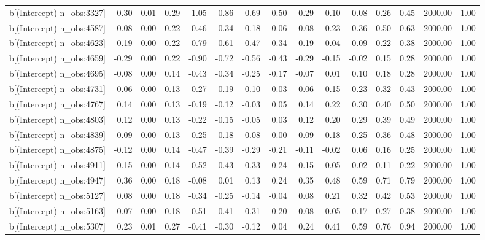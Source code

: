 \begin{table}[ht]
\begin{tabular}{rrrrrrrrrrrrrrr}
  b[(Intercept) n\_obs:3327] & -0.30 & 0.01 & 0.29 & -1.05 & -0.86 & -0.69 & -0.50 & -0.29 & -0.10 & 0.08 & 0.26 & 0.45 & 2000.00 & 1.00 \\ 
  b[(Intercept) n\_obs:4587] & 0.08 & 0.00 & 0.22 & -0.46 & -0.34 & -0.18 & -0.06 & 0.08 & 0.23 & 0.36 & 0.50 & 0.63 & 2000.00 & 1.00 \\ 
  b[(Intercept) n\_obs:4623] & -0.19 & 0.00 & 0.22 & -0.79 & -0.61 & -0.47 & -0.34 & -0.19 & -0.04 & 0.09 & 0.22 & 0.38 & 2000.00 & 1.00 \\ 
  b[(Intercept) n\_obs:4659] & -0.29 & 0.00 & 0.22 & -0.90 & -0.72 & -0.56 & -0.43 & -0.29 & -0.15 & -0.02 & 0.15 & 0.28 & 2000.00 & 1.00 \\ 
  b[(Intercept) n\_obs:4695] & -0.08 & 0.00 & 0.14 & -0.43 & -0.34 & -0.25 & -0.17 & -0.07 & 0.01 & 0.10 & 0.18 & 0.28 & 2000.00 & 1.00 \\ 
  b[(Intercept) n\_obs:4731] & 0.06 & 0.00 & 0.13 & -0.27 & -0.19 & -0.10 & -0.03 & 0.06 & 0.15 & 0.23 & 0.32 & 0.43 & 2000.00 & 1.00 \\ 
  b[(Intercept) n\_obs:4767] & 0.14 & 0.00 & 0.13 & -0.19 & -0.12 & -0.03 & 0.05 & 0.14 & 0.22 & 0.30 & 0.40 & 0.50 & 2000.00 & 1.00 \\ 
  b[(Intercept) n\_obs:4803] & 0.12 & 0.00 & 0.13 & -0.22 & -0.15 & -0.05 & 0.03 & 0.12 & 0.20 & 0.29 & 0.39 & 0.49 & 2000.00 & 1.00 \\ 
  b[(Intercept) n\_obs:4839] & 0.09 & 0.00 & 0.13 & -0.25 & -0.18 & -0.08 & -0.00 & 0.09 & 0.18 & 0.25 & 0.36 & 0.48 & 2000.00 & 1.00 \\ 
  b[(Intercept) n\_obs:4875] & -0.12 & 0.00 & 0.14 & -0.47 & -0.39 & -0.29 & -0.21 & -0.11 & -0.02 & 0.06 & 0.16 & 0.25 & 2000.00 & 1.00 \\ 
  b[(Intercept) n\_obs:4911] & -0.15 & 0.00 & 0.14 & -0.52 & -0.43 & -0.33 & -0.24 & -0.15 & -0.05 & 0.02 & 0.11 & 0.22 & 2000.00 & 1.00 \\ 
  b[(Intercept) n\_obs:4947] & 0.36 & 0.00 & 0.18 & -0.08 & 0.01 & 0.13 & 0.24 & 0.35 & 0.48 & 0.59 & 0.71 & 0.79 & 2000.00 & 1.00 \\ 
  b[(Intercept) n\_obs:5127] & 0.08 & 0.00 & 0.18 & -0.34 & -0.25 & -0.14 & -0.04 & 0.08 & 0.21 & 0.32 & 0.42 & 0.53 & 2000.00 & 1.00 \\ 
  b[(Intercept) n\_obs:5163] & -0.07 & 0.00 & 0.18 & -0.51 & -0.41 & -0.31 & -0.20 & -0.08 & 0.05 & 0.17 & 0.27 & 0.38 & 2000.00 & 1.00 \\ 
  b[(Intercept) n\_obs:5307] & 0.23 & 0.01 & 0.27 & -0.41 & -0.30 & -0.12 & 0.04 & 0.24 & 0.41 & 0.59 & 0.76 & 0.94 & 2000.00 & 1.00 \\ 

\end{tabular}
\end{table}
